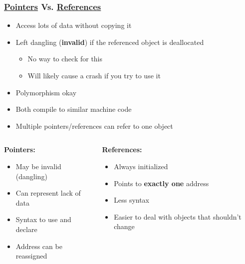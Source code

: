 \documentclass[glossy]{beamer}
\newcommand{\cppref}[2]{\href{http://en.cppreference.com/w/cpp/#1}{\underline{#2}}}
\begin{document}
\begin{frame}[fragile=singleslide]
  \frametitle{\cppref{language/pointer}{Pointers} Vs. \cppref{language/reference}{References}}

  \begin{itemize}
    \item Access lots of data without copying it
    \item Left dangling (\textbf{invalid}) if the referenced object is deallocated
    \begin{itemize}
      \item No way to check for this
      \item Will likely cause a crash if you try to use it
    \end{itemize}
    \item Polymorphism okay
    \item Both compile to similar machine code
    \item Multiple pointers/references can refer to one object
  \end{itemize}

  \begin{columns}
    \begin{column}{6cm}
      \textbf{Pointers:}
      \begin{itemize}
        \item May be invalid (dangling)
        \item Can represent lack of data
        \item Syntax to use and declare
        \item Address can be reassigned
      \end{itemize}
    \end{column}

    \begin{column}{6cm}
      \textbf{References:}
      \begin{itemize}
        \item Always initialized
        \item Points to \textbf{exactly one} address
        \item Less syntax
        \item Easier to deal with objects that shouldn't change
      \end{itemize}
    \end{column}
  \end{columns}
\end{frame}

\end{document}
